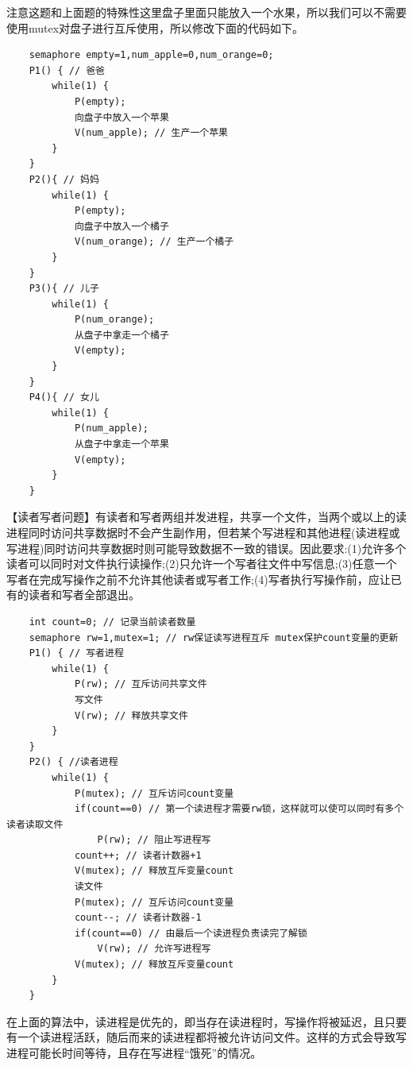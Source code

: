 \documentclass[lang=cn,10pt]{elegantbook}
\begin{document}
注意这题和上面题的特殊性这里盘子里面只能放入一个水果，所以我们可以不需要使用mutex对盘子进行互斥使用，所以修改下面的代码如下。

\begin{lstlisting}
    semaphore empty=1,num_apple=0,num_orange=0;
    P1() { // 爸爸
        while(1) {
            P(empty);
            向盘子中放入一个苹果
            V(num_apple); // 生产一个苹果
        }
    }
    P2(){ // 妈妈
        while(1) {
            P(empty);
            向盘子中放入一个橘子
            V(num_orange); // 生产一个橘子
        }
    } 
    P3(){ // 儿子
        while(1) {
            P(num_orange);
            从盘子中拿走一个橘子
            V(empty);
        }
    }
    P4(){ // 女儿
        while(1) {
            P(num_apple);
            从盘子中拿走一个苹果
            V(empty);
        }
    }
\end{lstlisting}

【读者写者问题】有读者和写者两组并发进程，共享一个文件，当两个或以上的读进程同时访问共享数据时不会产生副作用，但若某个写进程和其他进程(读进程或写进程)同时访问共享数据时则可能导致数据不一致的错误。因此要求:(1)允许多个读者可以同时对文件执行读操作;(2)只允许一个写者往文件中写信息;(3)任意一个写者在完成写操作之前不允许其他读者或写者工作;(4)写者执行写操作前，应让已有的读者和写者全部退出。

\begin{lstlisting}
    int count=0; // 记录当前读者数量
    semaphore rw=1,mutex=1; // rw保证读写进程互斥 mutex保护count变量的更新
    P1() { // 写者进程
        while(1) {
            P(rw); // 互斥访问共享文件
            写文件
            V(rw); // 释放共享文件
        }
    }
    P2() { //读者进程
        while(1) {
            P(mutex); // 互斥访问count变量
            if(count==0) // 第一个读进程才需要rw锁，这样就可以使可以同时有多个读者读取文件
                P(rw); // 阻止写进程写
            count++; // 读者计数器+1
            V(mutex); // 释放互斥变量count
            读文件
            P(mutex); // 互斥访问count变量
            count--; // 读者计数器-1
            if(count==0) // 由最后一个读进程负责读完了解锁
                V(rw); // 允许写进程写
            V(mutex); // 释放互斥变量count
        }
    }

\end{lstlisting}

在上面的算法中，读进程是优先的，即当存在读进程时，写操作将被延迟，且只要有一个读进程活跃，随后而来的读进程都将被允许访问文件。这样的方式会导致写进程可能长时间等待，且存在写进程“饿死”的情况。
\end{document}
